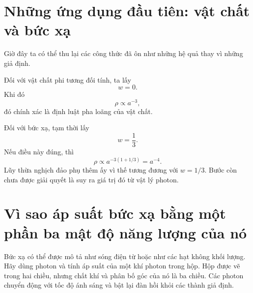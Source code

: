\section{Những ứng dụng đầu tiên: vật chất và bức xạ}

Giờ đây ta có thể thu lại các công thức đã ôn như những hệ quả thay vì những giả định.

Đối với vật chất phi tương đối tính, ta lấy
\begin{equation}
w=0.
\end{equation}
Khi đó
\begin{equation}
\rho\propto a^{-3},
\end{equation}
đó chính xác là định luật pha loãng của vật chất.

Đối với bức xạ, tạm thời lấy
\begin{equation}
w=\frac13.
\end{equation}
Nếu điều này đúng, thì
\begin{equation}
\rho\propto a^{-3(1+1/3)}=a^{-4}.
\end{equation}
Lũy thừa nghịch đảo phụ thêm ấy vì thế tương đương với \(w=1/3\). Bước còn chưa được giải quyết là suy ra giá trị đó từ vật lý photon.

\section{Vì sao áp suất bức xạ bằng một phần ba mật độ năng lượng của nó}

Bức xạ có thể được mô tả như sóng điện từ hoặc như các hạt không khối lượng. Hãy dùng photon và tính áp suất của một khí photon trong hộp. Hộp được vẽ trong hai chiều, nhưng chất khí và phân bố góc của nó là ba chiều. Các photon chuyển động với tốc độ ánh sáng và bật lại đàn hồi khỏi các thành giả định.

